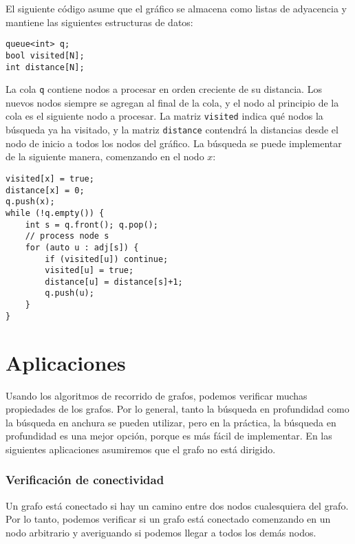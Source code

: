 El siguiente código asume que el gráfico se almacena
como listas de adyacencia y mantiene las siguientes
estructuras de datos:
\begin{lstlisting}
queue<int> q;
bool visited[N];
int distance[N];
\end{lstlisting}

La cola \texttt{q}
contiene nodos a procesar
en orden creciente de su distancia.
Los nuevos nodos siempre se agregan al final
de la cola, y el nodo al principio
de la cola es el siguiente nodo a procesar.
La matriz \texttt{visited} indica
qué nodos la búsqueda ya ha visitado,
y la matriz \texttt{distance} contendrá la
distancias desde el nodo de inicio a todos los nodos del gráfico.
La búsqueda se puede implementar de la siguiente manera,
comenzando en el nodo $x$:
\begin{lstlisting}
visited[x] = true;
distance[x] = 0;
q.push(x);
while (!q.empty()) {
    int s = q.front(); q.pop();
    // process node s
    for (auto u : adj[s]) {
        if (visited[u]) continue;
        visited[u] = true;
        distance[u] = distance[s]+1;
        q.push(u);
    }
}
\end{lstlisting}

\section{Aplicaciones}

Usando los algoritmos de recorrido de grafos,
podemos verificar muchas propiedades de los grafos.
Por lo general, tanto la búsqueda en profundidad como
la búsqueda en anchura se pueden utilizar,
pero en la práctica, la búsqueda en profundidad
es una mejor opción, porque es
más fácil de implementar.
En las siguientes aplicaciones asumiremos que
el grafo no está dirigido.

\subsubsection{Verificación de conectividad}


Un grafo está conectado si hay un camino
entre dos nodos cualesquiera del grafo.
Por lo tanto, podemos verificar si un grafo está conectado
comenzando en un nodo arbitrario y
averiguando si podemos llegar a todos los demás nodos.

